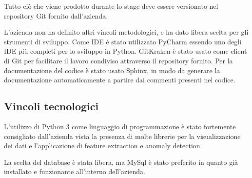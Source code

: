 Tutto ciò che viene prodotto durante lo stage deve essere versionato nel repository Git fornito dall'azienda.

L'azienda non ha definito altri vincoli metodologici, e ha dato libera scelta per gli strumenti di sviluppo. Come IDE è stato utilizzato PyCharm essendo uno degli IDE più completi per lo sviluppo in Python. GitKraken è stato usato come client di Git per facilitare il lavoro condiviso attraverso il repository fornito. Per la documentazione del codice è stato usato Sphinx, in modo da generare la documentazione automaticamente a partire dai commenti presenti nel codice.

\subsection{Vincoli tecnologici}
L'utilizzo di Python 3 come linguaggio di programmazione è stato fortemente consigliato dall'azienda vista la presenza di molte librerie per la visualizzazione dei dati e l'applicazione di feature extraction e anomaly detection.

La scelta del database è stata libera, ma MySql è stato preferito in quanto già installato e funzionante all'interno dell'azienda.

